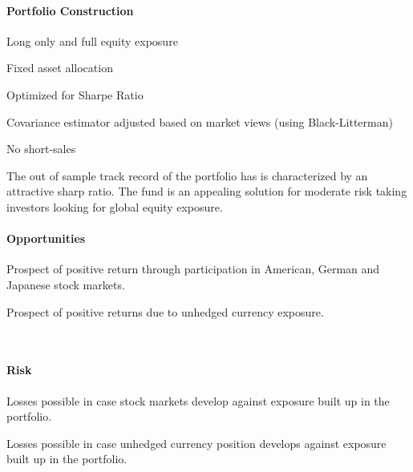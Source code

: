 \documentclass[11pt, parskip=full, DIV=14, headings=small, footsepline, footinclude=false, headsepline]{scrreprt}
\begin{document}
\begin{minipage}{0.5\textwidth}
\paragraph{Portfolio Construction}
\begin{sit}
\item Long only and full equity exposure
\item Fixed asset allocation
\item Optimized for Sharpe Ratio
\item Covariance estimator adjusted based on market views (using Black-Litterman)
\item No short-sales
\end{sit}
\end{minipage}
\begin{minipage}{0.5\textwidth}
\end{minipage}

The out of sample track record of the portfolio has is characterized by an attractive sharp ratio.
The fund is an appealing solution for moderate risk taking investors looking for global equity exposure.

\begin{minipage}[t]{0.49\textwidth}
  \paragraph{Opportunities}
  \begin{sit}
    \item Prospect of positive return through participation in American, German and Japanese stock markets.
    \item Prospect of positive returns due to unhedged currency exposure.
  \end{sit}
\end{minipage}
~~
\begin{minipage}[t]{0.49\textwidth}
  \paragraph{Risk}
  \begin{sit}
    \item Losses possible in case stock markets develop against exposure built up in the portfolio.
    \item Losses possible in case unhedged currency position develops against exposure built up in the portfolio.    
  \end{sit}
\end{minipage}
\end{document}
